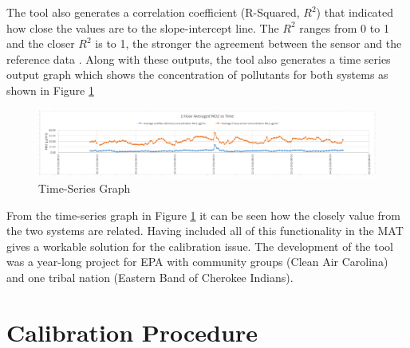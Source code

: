 The tool also generates a correlation coefficient (R-Squared, $R^2 $) that indicated how close the values are to the slope-intercept line. The $R^2 $ ranges from 0 to 1 and the closer $R^2$ is to 1, the stronger the agreement between the sensor and the reference data \cite{Williams2018}. Along with these outputs, the tool also generates a time series output graph which shows the concentration of pollutants for both systems as shown in Figure \ref{time}

\begin{figure}[h]
    \begin{center}
    \includegraphics[scale=0.55]{./images/figure8.png}
    \end{center}
    \caption{Time-Series Graph}
    \label{time}
  \end{figure}

From the time-series graph in Figure \ref{time} it can be seen how the closely value from the two systems are related.
Having included all of this functionality in the MAT gives a workable solution for the calibration issue. The development of the tool was a year-long project for EPA with community groups (Clean Air
Carolina) and  one tribal nation (Eastern Band of Cherokee Indians).






\section{Calibration Procedure}


